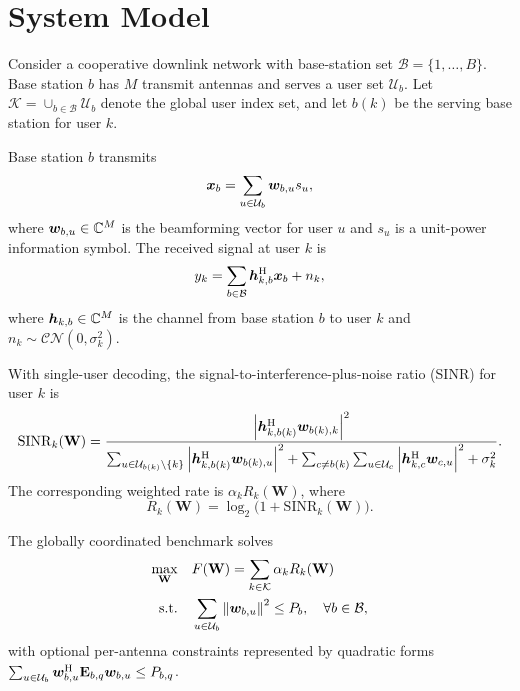 \section{System Model}

Consider a cooperative downlink network with base-station set $\mathcal{B} = \{1,\dots,B\}$. Base station $b$ has $M$ transmit antennas and serves a user set $\mathcal{U}_b$. Let $\mathcal{K} = \cup_{b \in \mathcal{B}} \mathcal{U}_b$ denote the global user index set, and let $b(k)$ be the serving base station for user $k$.

Base station $b$ transmits
\begin{equation}
\boldsymbol{x}_b = \sum_{u \in \mathcal{U}_b} \boldsymbol{w}_{b,u} s_u,
\end{equation}
where $\boldsymbol{w}_{b,u} \in \mathbb{C}^M$ is the beamforming vector for user $u$ and $s_u$ is a unit-power information symbol. The received signal at user $k$ is
\begin{equation}
y_k = \sum_{b \in \mathcal{B}} \boldsymbol{h}_{k,b}^{\mathrm{H}} \boldsymbol{x}_b + n_k,
\label{eq:received_signal}
\end{equation}
where $\boldsymbol{h}_{k,b} \in \mathbb{C}^M$ is the channel from base station $b$ to user $k$ and $n_k \sim \mathcal{CN}(0,\sigma_k^2)$.

With single-user decoding, the signal-to-interference-plus-noise ratio (SINR) for user $k$ is
\begin{equation}
\mathrm{SINR}_k(\mathbf{W}) =
\frac{\left|\boldsymbol{h}_{k,b(k)}^{\mathrm{H}} \boldsymbol{w}_{b(k),k}\right|^2}
{\sum_{u \in \mathcal{U}_{b(k)} \setminus \{k\}} \left|\boldsymbol{h}_{k,b(k)}^{\mathrm{H}} \boldsymbol{w}_{b(k),u}\right|^2
+ \sum_{c \neq b(k)} \sum_{u \in \mathcal{U}_c} \left|\boldsymbol{h}_{k,c}^{\mathrm{H}} \boldsymbol{w}_{c,u}\right|^2
+ \sigma_k^2}.
\label{eq:sinr}
\end{equation}
The corresponding weighted rate is $\alpha_k R_k(\mathbf{W})$, where
\begin{equation}
R_k(\mathbf{W}) = \log_2 \bigl(1 + \mathrm{SINR}_k(\mathbf{W})\bigr).
\end{equation}

The globally coordinated benchmark solves
\begin{align}
\max_{\mathbf{W}} \quad & F(\mathbf{W}) = \sum_{k \in \mathcal{K}} \alpha_k R_k(\mathbf{W}) \label{eq:global_objective} \\
\text{s.t.} \quad &
\sum_{u \in \mathcal{U}_b} \left\lVert \boldsymbol{w}_{b,u} \right\rVert^2 \le P_b, \quad \forall b \in \mathcal{B},
\label{eq:sum_power_constraint}
\end{align}
with optional per-antenna constraints represented by quadratic forms $\sum_{u \in \mathcal{U}_b} \boldsymbol{w}_{b,u}^{\mathrm{H}} \mathbf{E}_{b,q} \boldsymbol{w}_{b,u} \le P_{b,q}$.

